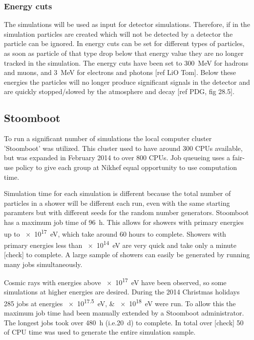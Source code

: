 \subsubsection{Energy cuts}

The \corsika simulations will be used as input for detector simulations. Therefore, if in the simulation particles are created which will not be detected by a \hisparc detector the particle can be ignored. In \corsika energy cuts can be set for different types of particles, as soon as particle of that type drop below that energy value they are no longer tracked in the simulation. The energy cuts have been set to \SI{300}{\MeV} for hadrons and muons, and \SI{3}{\MeV} for electrons and photons [ref LiO Tom]. Below these energies the particles will no longer produce significant signals in the detector and are quickly stopped/slowed by the atmosphere and decay [ref PDG, fig 28.5].


\subsection{Stoomboot}

To run a significant number of simulations the local \nikhef computer cluster 'Stoomboot' was utilized. This cluster used to have around 300 CPUs available, but was expanded in February 2014 to over 800 CPUs. Job queueing uses a fair-use policy to give each group at Nikhef equal opportunity to use computation time.

Simulation time for each simulation is different because the total number of particles in a shower will be different each run, even with the same starting paramters but with different seeds for the random number generators. Stoomboot has a maximum job time of \SI{96}{\hour}. This allows for showers with primary energies up to \SI{e17}{\eV}, which take around 60 hours to complete. Showers with primary energies less than \SI{e14}{\eV} are very quick and take only a minute [check] to complete. A large sample of showers can easily be generated by running many jobs simultaneously.

Cosmic rays with energies above \SI{e17}{\eV} have been observed, so some simulations at higher energies are desired. During the 2014 Christmas holidays 285 jobs at energies \SIlist{e17.5;e18}{\eV} were run. To allow this the maximum job time had been manually extended by a Stoomboot administrator. The longest jobs took over \SI{480}{\hour} (i.e.\SI{20}{\day}) to complete. In total over [check] \SI{50}{\year} of CPU time was used to generate the entire simulation sample.

